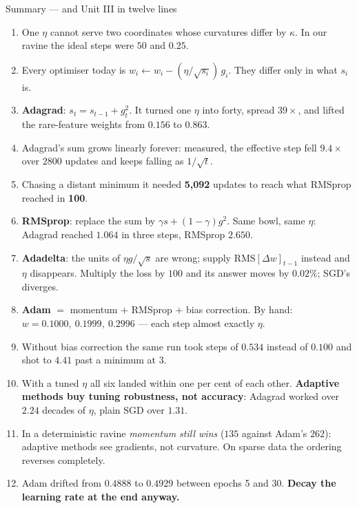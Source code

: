 \documentclass[aspectratio=169]{beamer}
\begin{document}
\begin{frame}[shrink=14]{Summary --- and Unit III in twelve lines}
  \begin{enumerate}\small
    \item One $\eta$ cannot serve two coordinates whose curvatures differ by
      $\kappa$. In our ravine the ideal steps were $50$ and $0.25$.
    \item Every optimiser today is $w_i \leftarrow w_i -
      (\eta/\sqrt{s_i})\,g_i$. They differ only in what $s_i$ is.
    \item \textbf{Adagrad}: $s_t = s_{t-1} + g_t^2$. It turned one $\eta$ into
      forty, spread $39\times$, and lifted the rare-feature weights from
      $0.156$ to $0.863$.
    \item Adagrad's sum grows linearly forever: measured, the effective step
      fell $9.4\times$ over $2800$ updates and keeps falling as $1/\sqrt{t}$.
    \item Chasing a distant minimum it needed \textbf{5{,}092} updates to reach
      what RMSprop reached in \textbf{100}.
    \item \textbf{RMSprop}: replace the sum by $\gamma s + (1-\gamma)g^2$. Same
      bowl, same $\eta$: Adagrad reached $1.064$ in three steps, RMSprop
      $2.650$.
    \item \textbf{Adadelta}: the units of $\eta g/\sqrt{s}$ are wrong; supply
      $\mathrm{RMS}[\Delta w]_{t-1}$ instead and $\eta$ disappears. Multiply the
      loss by $100$ and its answer moves by $0.02\%$; SGD's diverges.
    \item \textbf{Adam} $=$ momentum $+$ RMSprop $+$ bias correction. By hand:
      $w = 0.1000,\ 0.1999,\ 0.2996$ --- each step almost exactly $\eta$.
    \item Without bias correction the same run took steps of $0.534$ instead of
      $0.100$ and shot to $4.41$ past a minimum at $3$.
    \item With a tuned $\eta$ all six landed within one per cent of each other.
      \textbf{Adaptive methods buy tuning robustness, not accuracy}: Adagrad
      worked over $2.24$ decades of $\eta$, plain SGD over $1.31$.
    \item In a deterministic ravine \emph{momentum still wins} ($135$ against
      Adam's $262$): adaptive methods see gradients, not curvature. On sparse
      data the ordering reverses completely.
    \item Adam drifted from $0.4888$ to $0.4929$ between epochs 5 and 30.
      \textbf{Decay the learning rate at the end anyway.}
  \end{enumerate}
\end{frame}
\end{document}
